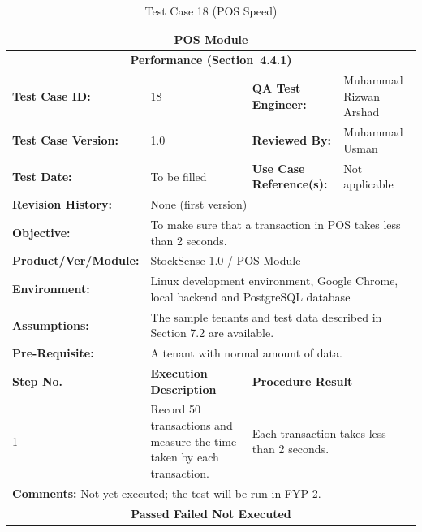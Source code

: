 \documentclass{StockSense}
\begin{document}
\begin{table}[!htbp]
\centering
\caption{Test Case 18 (POS Speed)}
{\small\linespread{1}\selectfont\renewcommand{\arraystretch}{1.25}
\begin{tabular}{|p{}|p{}|p{}|p{}|}
\hline
\multicolumn{4}{|c|}{\textbf{POS Module}} \\ \hline
\multicolumn{4}{|c|}{\textbf{Performance (Section~4.4.1)}} \\ \hline
\textbf{Test Case ID:} & 18 & \textbf{QA Test Engineer:} & Muhammad Rizwan Arshad \\ \hline
\textbf{Test Case Version:} & 1.0 & \textbf{Reviewed By:} & Muhammad Usman \\ \hline
\textbf{Test Date:} & To be filled & \textbf{Use Case Reference(s):} & Not applicable \\ \hline
\textbf{Revision History:} & \multicolumn{3}{p{\dimexpr0.70\textwidth+4\tabcolsep\relax}|}{None (first version)} \\ \hline
\textbf{Objective:} & \multicolumn{3}{p{\dimexpr0.70\textwidth+4\tabcolsep\relax}|}{To make sure that a transaction in POS takes less than 2 seconds.} \\ \hline
\textbf{Product/Ver/Module:} & \multicolumn{3}{p{\dimexpr0.70\textwidth+4\tabcolsep\relax}|}{StockSense 1.0 / POS Module} \\ \hline
\textbf{Environment:} & \multicolumn{3}{p{\dimexpr0.70\textwidth+4\tabcolsep\relax}|}{Linux development environment, Google Chrome, local backend and PostgreSQL database} \\ \hline
\textbf{Assumptions:} & \multicolumn{3}{p{\dimexpr0.70\textwidth+4\tabcolsep\relax}|}{The sample tenants and test data described in Section 7.2 are available.} \\ \hline
\textbf{Pre-Requisite:} & \multicolumn{3}{p{\dimexpr0.70\textwidth+4\tabcolsep\relax}|}{A tenant with normal amount of data.} \\ \hline
\textbf{Step No.} & \textbf{Execution Description} & \multicolumn{2}{l|}{\textbf{Procedure Result}} \\ \hline
1 & Record 50 transactions and measure the time taken by each transaction. & \multicolumn{2}{p{\dimexpr0.42\textwidth+2\tabcolsep\relax}|}{Each transaction takes less than 2 seconds.} \\ \hline
\multicolumn{4}{|l|}{\textbf{Comments:} Not yet executed; the test will be run in FYP-2.} \\ \hline
\multicolumn{4}{|c|}{\textbf{Passed \quad Failed \quad Not Executed}} \\ \hline
\end{tabular}\par}
\end{table}
\end{document}
